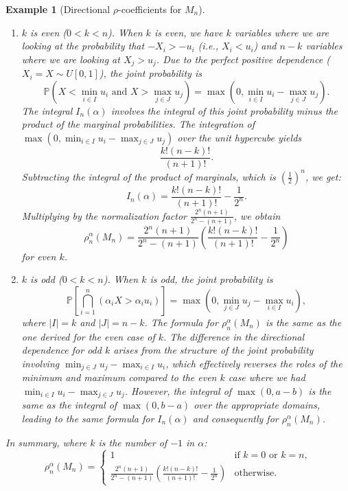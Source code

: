 \documentclass[11pt,a4paper]{article}
\newtheorem{example}{Example}
\begin{document}
\begin{example}[Directional $\rho$-coefficients for $M_n$]
\begin{enumerate}
$$
I_n((-1,\ldots,-1)) = \frac{1}{n+1} - \frac{1}{2^n}.
$$
Substituting into the definition of $\rho_n^\alpha(M_n)$:
$$
\rho_n^{(-1,-1,\ldots,-1)}(M_n) = \frac{2^n(n+1)}{2^n-(n+1)} \left( \frac{1}{n+1} - \frac{1}{2^n} \right) = \frac{2^n(n+1)}{2^n-(n+1)} \frac{2^n - (n+1)}{(n+1)2^n} = 1.
$$
\item $k$ is even ($0 < k < n$). When $k$ is even, we have $k$ variables where we are looking at the probability that $-X_i > -u_i$ (i.e., $X_i < u_i$) and $n-k$ variables where we are looking at $X_j > u_j$. Due to the perfect positive dependence ($X_i = X \sim U[0,1]$), the joint probability is
$$\mathbb{P}\left(X < \min_{i \in I} u_i \text{ and } X > \max_{j \in J} u_j\right) = \max\left(0, \min_{i \in I} u_i - \max_{j \in J} u_j\right).$$
The integral $I_n(\alpha)$ involves the integral of this joint probability minus the product of the marginal probabilities. The integration of $\max\left(0, \min_{i \in I} u_i - \max_{j \in J} u_j\right)$ over the unit hypercube yields
$$ \frac{k! (n-k)!}{(n+1)!}.$$
Subtracting the integral of the product of marginals, which is $\left(\frac{1}{2}\right)^n$, we get:
$$I_n(\alpha) = \frac{k! (n-k)!}{(n+1)!} - \frac{1}{2^n} .$$
Multiplying by the normalization factor $\frac{2^n(n+1)}{2^n-(n+1)}$, we obtain
$$\rho_n^\alpha(M_n) = \frac{2^n(n+1)}{2^n-(n+1)} \left( \frac{k! (n-k)!}{(n+1)!} - \frac{1}{2^n} \right)$$
for even $k$.
\item $k$ is odd ($0 < k < n$). When $k$ is odd, the joint probability is $$\mathbb{P}\left[\bigcap_{i=1}^n(\alpha_iX>\alpha_iu_i)\right] = \max\left(0, \min_{j \in J} u_j - \max_{i \in I} u_i\right),$$
where $|I| = k$ and $|J| = n-k$. The formula for $\rho_n^\alpha(M_n)$ is the same as the one derived for the even case of $k$. The difference in the directional dependence for odd $k$ arises from the structure of the joint probability involving $\min_{j \in J} u_j - \max_{i \in I} u_i$, which effectively reverses the roles of the minimum and maximum compared to the even $k$ case where we had $\min_{i \in I} u_i - \max_{j \in J} u_j$. However, the integral of $\max(0, a-b)$ is the same as the integral of $\max(0, b-a)$ over the appropriate domains, leading to the same formula for $I_n(\alpha)$ and consequently for $\rho_n^\alpha(M_n)$.
\end{enumerate}
In summary, where $k$ is the number of $-1$ in $\alpha$:
$$
\rho_n^\alpha(M_n) = \begin{cases}
1 & \text{if } k = 0 \text{ or } k = n, \\
\displaystyle\frac{2^n(n+1)}{2^n-(n+1)} \left( \frac{k! (n-k)!}{(n+1)!} - \frac{1}{2^n} \right) & \text{otherwise}.
\end{cases}
$$
\end{example}
\end{document}
